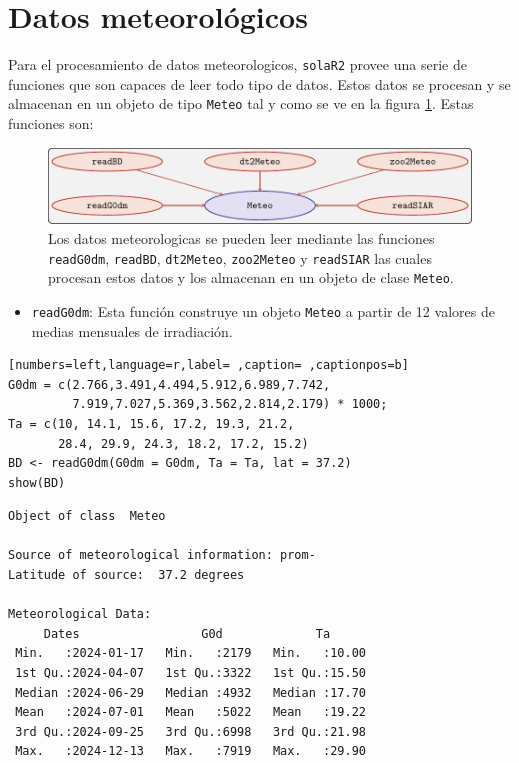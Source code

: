 \section{Datos meteorológicos}
\label{sec:orgccee5f7}
\label{sec:datos-meteorologicos}
Para el procesamiento de datos meteorologicos, \texttt{solaR2} provee una serie de funciones que son capaces de leer todo tipo de datos. Estos datos se procesan y se almacenan en un objeto de tipo \texttt{Meteo} tal y como se ve en la figura \ref{fig:meteo}. Estas funciones son:
\begin{figure}[htbp]
\centering
\includegraphics[keepaspectratio,width=\textwidth,height=0.5\textheight]{figuras/meteo.pdf}
\caption{Los datos meteorologicas se pueden leer mediante las funciones \texttt{readG0dm}, \texttt{readBD}, \texttt{dt2Meteo}, \texttt{zoo2Meteo} y \texttt{readSIAR} las cuales procesan estos datos y los almacenan en un objeto de clase \texttt{Meteo}. \label{fig:meteo}}
\end{figure}
\begin{itemize}
\item \texttt{readG0dm}: Esta función construye un objeto \texttt{Meteo} a partir de 12 valores de medias mensuales de irradiación.
\end{itemize}
\begin{lstlisting}[numbers=left,language=r,label= ,caption= ,captionpos=b]
G0dm = c(2.766,3.491,4.494,5.912,6.989,7.742,
         7.919,7.027,5.369,3.562,2.814,2.179) * 1000;
Ta = c(10, 14.1, 15.6, 17.2, 19.3, 21.2,
       28.4, 29.9, 24.3, 18.2, 17.2, 15.2)
BD <- readG0dm(G0dm = G0dm, Ta = Ta, lat = 37.2)
show(BD)
\end{lstlisting}

\begin{verbatim}
Object of class  Meteo 

Source of meteorological information: prom- 
Latitude of source:  37.2 degrees

Meteorological Data:
     Dates                 G0d             Ta       
 Min.   :2024-01-17   Min.   :2179   Min.   :10.00  
 1st Qu.:2024-04-07   1st Qu.:3322   1st Qu.:15.50  
 Median :2024-06-29   Median :4932   Median :17.70  
 Mean   :2024-07-01   Mean   :5022   Mean   :19.22  
 3rd Qu.:2024-09-25   3rd Qu.:6998   3rd Qu.:21.98  
 Max.   :2024-12-13   Max.   :7919   Max.   :29.90
\end{verbatim}

